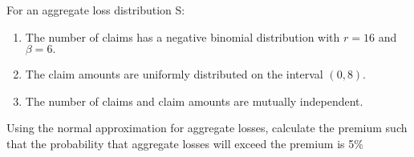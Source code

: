 For an aggregate loss distribution S: 
\begin{enumerate}
\item The number of claims has a negative binomial distribution with $r = 16$ and $\beta= 6.$
\item The claim amounts are uniformly distributed on the interval $(0, 8).$
\item The number of claims and claim amounts are mutually independent. 
\end{enumerate}
Using the normal approximation for aggregate losses, calculate the premium such that the probability that aggregate losses will exceed the premium is 5\%




